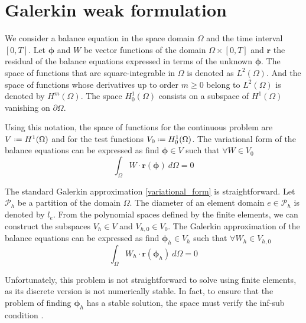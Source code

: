 \section{Galerkin weak formulation}



We consider a balance equation in the space domain $\Omega$ and the time interval $[0,T]$. Let $\bm{\phi}$ and $W$ be vector functions of the domain $\Omega \times [0,T]$ and $\mathbf{r}$ the residual of the balance equations expressed in terms of the unknown $\bm{\phi}$.
The space of functions that are square-integrable in $\Omega$ is denoted as $L^2(\Omega)$. And the space of functions whose derivatives up to order $m\geq0$ belong to $L^2(\Omega)$ is denoted by $H^m(\Omega)$. The space $H_0^1(\Omega)$ consists on a subspace of $H^1(\Omega)$ vanishing on $\partial \Omega$.

Using this notation, the space of functions for the continuous problem are $V \defeq H^1(\Omega)$ and for the test functions $V_0 \defeq H_0^1(\Omega)$.
The variational form of the balance equations can be expressed as find $\bm{\phi} \in V$ such that $\forall W \in V_0$
\begin{equation} \label{variational_form}
    \int_\Omega W \cdot \mathbf{r}(\bm{\phi}) \ d\Omega = 0
\end{equation}



The standard Galerkin approximation \ref{variational_form} is straightforward. Let $\mathcal{P}_h$ be a partition of the domain $\Omega$. The diameter of an element domain $e\in\mathcal{P}_h$ is denoted by $l_e$. From the polynomial spaces defined by the finite elements, we can construct the subspaces $V_h\in V$ and $V_{h,0}\in V_0$. The Galerkin approximation of the balance equations can be expressed as find $\bm{\phi}_h \in V_h$ such that $\forall W_h \in V_{h,0}$
\begin{equation} \label{discrete_variational}
    \int_\Omega W_h \cdot \mathbf{r}(\bm{\phi}_h) \ d\Omega = 0
\end{equation}

Unfortunately, this problem is not straightforward to solve using finite elements, as its discrete version is not numerically stable. In fact, to ensure that the problem of finding $\bm{\phi}_h$ has a stable solution, the space must verify the inf-sub condition \cite{codina2011}.




